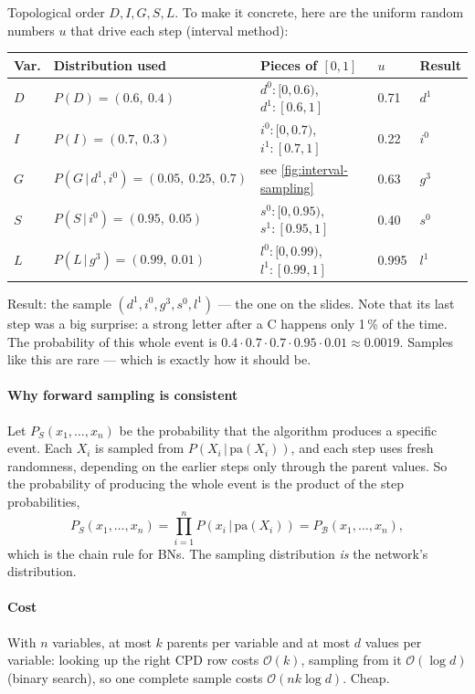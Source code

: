 \documentclass[11pt, oneside]{book}
\newcommand{\Prob}{\mathbb{P}}           %
\newcommand{\bigO}[1]{\mathcal{O}\!\left(#1\right)}
\newcommand{\given}{\,\vert\,}           %
\newcommand{\pa}{\mathrm{pa}}            %
\begin{document}
\begin{exbox}[title={One forward sample from the student network}]
Topological order $D, I, G, S, L$. To make it concrete, here are the uniform
random numbers $u$ that drive each step (interval method):
\begin{center}
\small
\begin{tabular}{@{}lllll@{}}
\toprule
\textbf{Var.} & \textbf{Distribution used} & \textbf{Pieces of $[0,1]$} & $u$ & \textbf{Result} \\
\midrule
$D$ & $P(D) = (0.6,\ 0.4)$ & $d^0\!: [0, 0.6)$, $d^1\!: [0.6, 1]$ & 0.71 & $d^1$ \\
$I$ & $P(I) = (0.7,\ 0.3)$ & $i^0\!: [0, 0.7)$, $i^1\!: [0.7, 1]$ & 0.22 & $i^0$ \\
$G$ & $P(G \given d^1, i^0) = (0.05,\ 0.25,\ 0.7)$ & see \cref{fig:interval-sampling} & 0.63 & $g^3$ \\
$S$ & $P(S \given i^0) = (0.95,\ 0.05)$ & $s^0\!: [0, 0.95)$, $s^1\!: [0.95, 1]$ & 0.40 & $s^0$ \\
$L$ & $P(L \given g^3) = (0.99,\ 0.01)$ & $l^0\!: [0, 0.99)$, $l^1\!: [0.99, 1]$ & 0.995 & $l^1$ \\
\bottomrule
\end{tabular}
\end{center}
Result: the sample $(d^1, i^0, g^3, s^0, l^1)$ --- the one on the slides. Note
that its last step was a big surprise: a strong letter after a C happens only
1\,\% of the time. The probability of this whole event is $0.4 \cdot 0.7
\cdot 0.7 \cdot 0.95 \cdot 0.01 \approx 0.0019$. Samples like this are rare
--- which is exactly how it should be.
\end{exbox}

\paragraph{Why forward sampling is consistent} Let $P_S(x_1, \ldots, x_n)$ be
the probability that the algorithm produces a specific event. Each $X_i$ is
sampled from $P(X_i \given \pa(X_i))$, and each step uses fresh randomness,
depending on the earlier steps only through the parent values. So the
probability of producing the whole event is the product of the step
probabilities,
\[
P_S(x_1, \ldots, x_n) = \prod_{i=1}^{n} P(x_i \given \pa(X_i)) = P_{\mathcal{B}}(x_1, \ldots, x_n),
\]
which is the chain rule for BNs. The sampling distribution \emph{is} the
network's distribution.

\paragraph{Cost} With $n$ variables, at most $k$ parents per variable and at
most $d$ values per variable: looking up the right CPD row costs $\bigO{k}$,
sampling from it $\bigO{\log d}$ (binary search), so one complete sample
costs $\bigO{n k \log d}$. Cheap.
\end{document}
